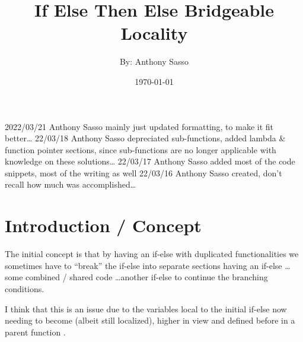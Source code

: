 \documentclass{article}
\title          {\Huge If Else Then Else Bridgeable Locality}
\author         {By: Anthony Sasso}
\date           {\today}
\newcommand{\clfootnote}[3]{\color{#2}{\footnote{\label{#1}{ \color{#2}{#3}}}}\color{defaultcolor}}
\begin{document}
    
    \maketitle

    \begin{versionhistory}
           {2022/03/21}    {Anthony Sasso} {mainly just updated formatting, to make it fit better\dots}
           {22/03/18}      {Anthony Sasso} {depreciated sub-functions, added lambda \& function pointer sections, since sub-functions are no longer applicable with knowledge on these solutions\dots}
             {22/03/17}      {Anthony Sasso} {added most of the code snippets, most of the writing as well}
           {22/03/16}      {Anthony Sasso} {created, don't recall how much was accomplished\dots}
    \end{versionhistory}

    \tableofcontents

    \newpage
    \section{Introduction / Concept}
        The initial concept is that by having an if-else with duplicated functionalities we sometimes have to ``break'' the if-else into separate sections having an if-else \dots some combined / shared code \dots another if-else to continue the branching conditions.

    \bigskip
        I think that this is an issue due to the variables local to the initial if-else now needing to become (albeit still localized), higher in view and defined before in a parent function \clfootnote{IntroClarificationNote}{blue}{which may not be wanted \& can cause issues as shown in the listed examples}.
\end{document}
